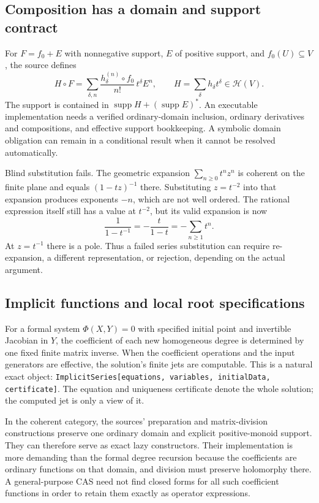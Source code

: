 \documentclass[11pt,letterpaper]{article}
\numberwithin{equation}{section}
\theoremstyle{definition}
\theoremstyle{remark}\newtheorem{remark}[theorem]{Remark}
\newcommand{\HH}{\mathscr H}
\newcommand{\supp}{\operatorname{supp}}
\begin{document}
\subsection{Composition has a domain and support contract}
For $F=f_0+E$ with nonnegative support, $E$ of positive support, and
$f_0(U)\subseteq V$, the source defines
\begin{equation}\label{eq:composition}
 H\circ F=
 \sum_{\delta,n}\frac{h_\delta^{(n)}\circ f_0}{n!}\,t^\delta E^n,
 \qquad H=\sum_\delta h_\delta t^\delta\in\HH(V).
\end{equation}
The support is contained in $\supp H+(\supp E)^*$.
An executable implementation needs a verified ordinary-domain inclusion,
ordinary derivatives and compositions, and effective support bookkeeping.
A symbolic domain obligation can remain in a conditional result when it
cannot be resolved automatically.

Blind substitution fails. The geometric expansion
$\sum_{n\ge0}t^nz^n$ is coherent on the finite plane and equals
$(1-tz)^{-1}$ there. Substituting $z=t^{-2}$ into that expansion produces
exponents $-n$, which are not well ordered. The rational expression itself
still has a value at $t^{-2}$, but its valid expansion is now
\[
 \frac1{1-t^{-1}}=-\frac{t}{1-t}=-\sum_{n\ge1}t^n.
\]
At $z=t^{-1}$ there is a pole. Thus a failed series substitution can require
re-expansion, a different representation, or rejection, depending on the
actual argument.

\subsection{Implicit functions and local root specifications}
For a formal system $\Phi(X,Y)=0$ with specified initial point and invertible
Jacobian in $Y$, the coefficient of each new homogeneous degree is determined
by one fixed finite matrix inverse. When the coefficient operations and the
input generators are effective, the solution's finite jets are computable.
This is a natural exact object:
\texttt{ImplicitSeries[equations, variables, initialData, certificate]}.
The equation and uniqueness certificate denote the whole solution; the
computed jet is only a view of it.

In the coherent category, the sources' preparation and matrix-division
constructions preserve one ordinary domain and explicit positive-monoid
support. They can therefore serve as exact lazy constructors. Their
implementation is more demanding than the formal degree recursion because
the coefficients are ordinary functions on that domain, and division must
preserve holomorphy there. A general-purpose CAS need not find closed forms
for all such coefficient functions in order to retain them exactly as
operator expressions.
\end{document}
